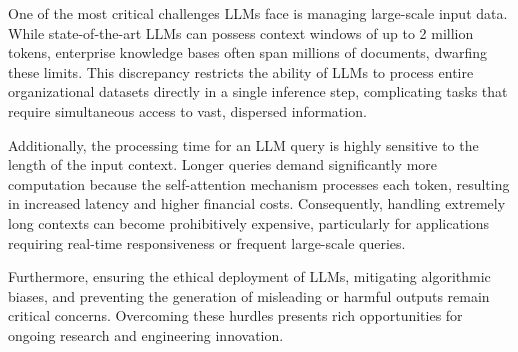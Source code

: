One of the most critical challenges LLMs face is managing large-scale input data. While state-of-the-art LLMs can possess context windows of up to 2 million tokens, enterprise knowledge bases often span millions of documents, dwarfing these limits. This discrepancy restricts the ability of LLMs to process entire organizational datasets directly in a single inference step, complicating tasks that require simultaneous access to vast, dispersed information. 

Additionally, the processing time for an LLM query is highly sensitive to the length of the input context. Longer queries demand significantly more computation because the self-attention mechanism processes each token, resulting in increased latency and higher financial costs. Consequently, handling extremely long contexts can become prohibitively expensive, particularly for applications requiring real-time responsiveness or frequent large-scale queries. 

Furthermore, ensuring the ethical deployment of LLMs, mitigating algorithmic biases, and preventing the generation of misleading or harmful outputs remain critical concerns. Overcoming these hurdles presents rich opportunities for ongoing research and engineering innovation.

\begin{table}[H]
    \centering
    \caption{Comparison of Selected Models Based on Context Window, Cost, and Performance.}
    \label{tab:model_comparison}
\end{table}

